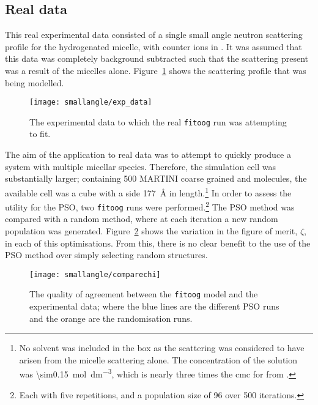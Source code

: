 \subsection{Real data}
\label{sec:real_data}
This real experimental data consisted of a single small angle neutron scattering profile for the hydrogenated  micelle, with  counter ions in .
It was assumed that this data was completely background subtracted such that the scattering present was a result of the micelles alone.
Figure~\ref{fig:expdata} shows the scattering profile that was being modelled.
%
\begin{figure}
    \centering
    \texttt{[image: smallangle/exp\_data]}
    \caption{The experimental data to which the real \texttt{fitoog} run was attempting to fit.}
    \label{fig:expdata}
\end{figure}
%

The aim of the application to real data was to attempt to quickly produce a system with multiple micellar species.
Therefore, the simulation cell was substantially larger; containing 500 MARTINI coarse grained  and  molecules, the available cell was a cube with a side \SI{177}{\angstrom} in length.\footnote{No solvent was included in the box as the scattering was considered to have arisen from the micelle scattering alone. The concentration of the solution was \SI{\sim0.15}{\mol\deci\meter^{-3}}, which is nearly three times the cmc for  from \cite{rodriguez_surface_2007}.}
In order to assess the utility for the PSO, two \texttt{fitoog} runs were performed.\footnote{Each with five repetitions, and a population size of 96 over 500 iterations.}
The PSO method was compared with a random method, where at each iteration a new random population was generated.
Figure~\ref{fig:chi} shows the variation in the figure of merit, $\zeta$, in each of this optimisations.
From this, there is no clear benefit to the use of the PSO method over simply selecting random structures.
%
\begin{figure}
    \centering
    \texttt{[image: smallangle/comparechi]}
    \caption{The quality of agreement between the \texttt{fitoog} model and the experimental data; where the blue lines are the different PSO runs and the orange are the randomisation runs.}
    \label{fig:chi}
\end{figure}
%

